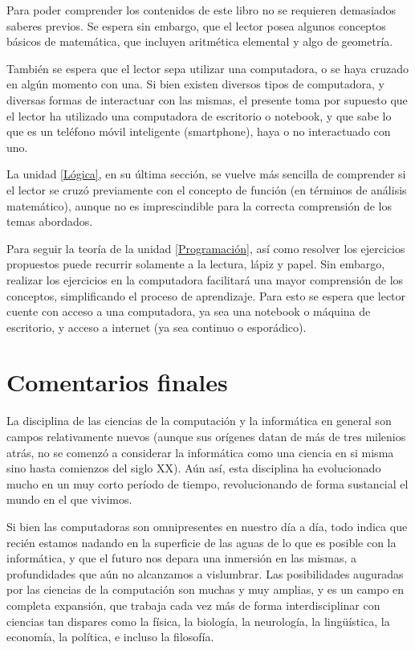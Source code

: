 Para poder comprender los contenidos de este libro no se requieren demasiados
saberes previos. Se espera sin embargo, que el lector posea algunos conceptos
básicos de matemática, que incluyen aritmética elemental y algo de geometría.

También se espera que el lector sepa utilizar una computadora, o se haya cruzado
en algún momento con una. Si bien existen diversos tipos de computadora, y
diversas formas de interactuar con las mismas, el presente toma por supuesto
que el lector ha utilizado una computadora de escritorio o notebook, y que sabe
lo que es un teléfono móvil inteligente (smartphone), haya o no interactuado con
uno.

La unidad \ref{Lógica}, en su última sección, se vuelve más sencilla de
comprender si el lector se cruzó previamente con el concepto de función
(en términos de análisis matemático), aunque no es imprescindible para la
correcta comprensión de los temas abordados.

Para seguir la teoría de la unidad \ref{Programación}, así como resolver los
ejercicios propuestos puede recurrir solamente a la lectura, lápiz y papel. Sin
embargo, realizar los ejercicios en la computadora facilitará una mayor
comprensión de los conceptos, simplificando el proceso de aprendizaje. Para esto
se espera que lector cuente con acceso a una computadora, ya sea una notebook o
máquina de escritorio, y acceso a internet (ya sea continuo o esporádico).

\section*{Comentarios finales}

La disciplina de las ciencias de la computación y la informática en general
son campos relativamente nuevos (aunque sus orígenes datan de más de tres
milenios atrás, no se comenzó a considerar la informática como una ciencia en
si misma sino hasta comienzos del siglo XX). Aún así, esta disciplina ha
evolucionado mucho en un muy corto período de tiempo, revolucionando de forma
sustancial el mundo en el que vivimos.

Si bien las computadoras son omnipresentes en nuestro día a día, todo indica
que recién estamos nadando en la superficie de las aguas de lo que es posible
con la informática, y que el futuro nos depara una inmersión en las mismas,
a profundidades que aún no alcanzamos a vislumbrar. Las posibilidades auguradas
por las ciencias de la computación son muchas y muy amplias, y es un campo en
completa expansión, que trabaja cada vez más de forma interdisciplinar con
ciencias tan dispares como la física, la biología, la neurología, la lingüística,
la economía, la política, e incluso la filosofía.

